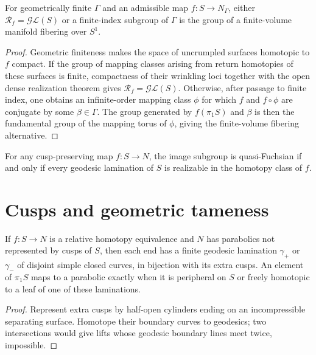 \begin{corollary}
\label{thurston-ch08-geometrically-finite-realization}
For geometrically finite $\Gamma$ and an admissible map $f:S\to N_\Gamma$, either $\mathcal R_f=\mathcal{GL}(S)$ or a finite-index subgroup of $\Gamma$ is the group of a finite-volume manifold fibering over $S^1$.
\end{corollary}
\begin{proof}
\sketch Geometric finiteness makes the space of uncrumpled surfaces homotopic to $f$ compact.  If the group of mapping classes arising from return homotopies of these surfaces is finite, compactness of their wrinkling loci together with the open dense realization theorem gives $\mathcal R_f=\mathcal{GL}(S)$.  Otherwise, after passage to finite index, one obtains an infinite-order mapping class $\phi$ for which $f$ and $f\circ\phi$ are conjugate by some $\beta\in\Gamma$.  The group generated by $f(\pi_1S)$ and $\beta$ is then the fundamental group of the mapping torus of $\phi$, giving the finite-volume fibering alternative.
\end{proof}

\begin{conjecture}
\label{thurston-ch08-realization-conjecture}
For any cusp-preserving map $f:S\to N$, the image subgroup is quasi-Fuchsian if and only if every geodesic lamination of $S$ is realizable in the homotopy class of $f$.
\end{conjecture}

\section{Cusps and geometric tameness}

\begin{proposition}
\label{thurston-ch08-extra-cusps}
If $f:S\to N$ is a relative homotopy equivalence and $N$ has parabolics not represented by cusps of $S$, then each end has a finite geodesic lamination $\gamma_+$ or $\gamma_-$ of disjoint simple closed curves, in bijection with its extra cusps.  An element of $\pi_1S$ maps to a parabolic exactly when it is peripheral on $S$ or freely homotopic to a leaf of one of these laminations.
\end{proposition}
\begin{proof}\sketch Represent extra cusps by half-open cylinders ending on an incompressible separating surface.  Homotope their boundary curves to geodesics; two intersections would give lifts whose geodesic boundary lines meet twice, impossible.\end{proof}

